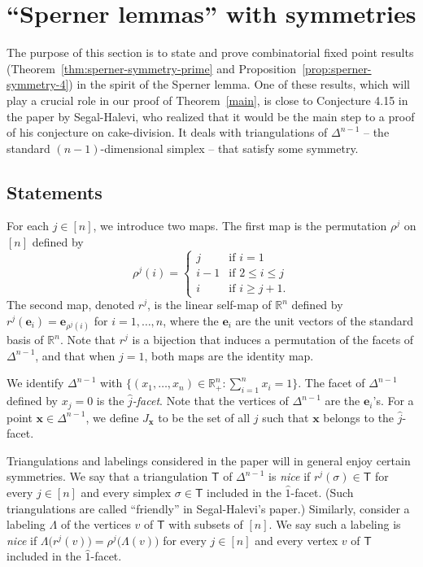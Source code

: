 \documentclass[12pt]{amsart}
\theoremstyle{definition}
\theoremstyle{remark}
\def\D{\mathcal{D}}
\def\R{\mathbb{R}}
\def\T{\mathsf{T}}
\def\ee{\boldsymbol{e}}
\def\xx{\boldsymbol{x}}
\begin{document}


\section{``Sperner lemmas'' with symmetries}\label{sec:sperner}

The purpose of this section is to state and prove combinatorial fixed point results (Theorem~\ref{thm:sperner-symmetry-prime} and Proposition~\ref{prop:sperner-symmetry-4}) in the spirit of the Sperner lemma. One of these results, which will play a crucial role in our proof of Theorem~\ref{main}, is close to Conjecture 4.15 in the paper by Segal-Halevi, who realized that it would be the main step to a proof of his conjecture on cake-division.  It deals with triangulations of $\Delta^{n-1}$ -- the standard $(n-1)$-dimensional simplex -- that satisfy some symmetry.


\subsection{Statements}
For each $j\in[n]$, we introduce two maps. The first map is the permutation $\rho^j$ on $[n]$ defined by 
$$\rho^j(i)=\left\{\begin{array}{ll} j & \mbox{if $i=1$} \\ i-1 & \mbox{if $2\leq i\leq j$} \\ i & \mbox{if $i\geq j+1$.}\end{array}\right.$$ The second map, denoted $r^j$, is the linear self-map of $\R^n$ defined by $r^j(\ee_i)=\ee_{\rho^j(i)}$ for $i=1,\ldots,n$, where the $\ee_i$ are the unit vectors of the standard basis of $\R^n$. Note that $r^j$ is a bijection that induces a permutation of the facets of $\Delta^{n-1}$, and that when $j=1$, both maps are the identity map.

We identify $\Delta^{n-1}$ with $\{(x_1,\ldots,x_n)\in\R^n_+\colon\sum_{i=1}^nx_i=1\}$. The facet of $\Delta^{n-1}$ defined by $x_j=0$ is the {\em $\widehat{j}$-facet}. Note that the vertices of $\Delta^{n-1}$ are the $\ee_i$'s. For a point $\xx\in\Delta^{n-1}$, we define $J_{\xx}$ to be the set of all $j$ such that $\xx$ belongs to the $\widehat{j}$-facet.


Triangulations and labelings considered in the paper will in general enjoy certain symmetries. We say that a triangulation $\T$ of $\Delta^{n-1}$ is {\em nice} if $r^j(\sigma)\in\T$ for every $j\in[n]$ and every simplex $\sigma\in\T$ included in the $\widehat{1}$-facet. (Such triangulations are called ``friendly'' in Segal-Halevi's paper.) Similarly, consider a labeling $\Lambda$ of the vertices $v$ of $\T$ with subsets of $[n]$. We say such a labeling is {\em nice} if $\Lambda\big(r^j(v)\big)=\rho^j\big(\Lambda(v)\big)$ for every $j\in [n]$ and every vertex $v$ of $\T$ included in the $\widehat{1}$-facet.
\end{document}
